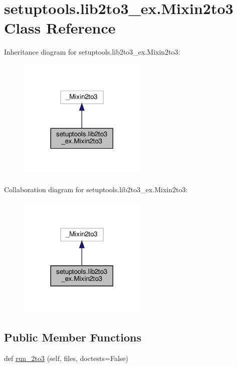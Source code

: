 \hypertarget{classsetuptools_1_1lib2to3__ex_1_1Mixin2to3}{}\section{setuptools.\+lib2to3\+\_\+ex.\+Mixin2to3 Class Reference}
\label{classsetuptools_1_1lib2to3__ex_1_1Mixin2to3}


Inheritance diagram for setuptools.\+lib2to3\+\_\+ex.\+Mixin2to3\+:
\nopagebreak
\begin{figure}[H]
\begin{center}
\leavevmode
\includegraphics[width=173pt]{classsetuptools_1_1lib2to3__ex_1_1Mixin2to3__inherit__graph}
\end{center}
\end{figure}


Collaboration diagram for setuptools.\+lib2to3\+\_\+ex.\+Mixin2to3\+:
\nopagebreak
\begin{figure}[H]
\begin{center}
\leavevmode
\includegraphics[width=173pt]{classsetuptools_1_1lib2to3__ex_1_1Mixin2to3__coll__graph}
\end{center}
\end{figure}
\subsection*{Public Member Functions}
\begin{DoxyCompactItemize}
\item 
def \hyperlink{classsetuptools_1_1lib2to3__ex_1_1Mixin2to3_aae906a32ac6d5e790cc30d9505995f11}{run\+\_\+2to3} (self, files, doctests=False)
\end{DoxyCompactItemize}

